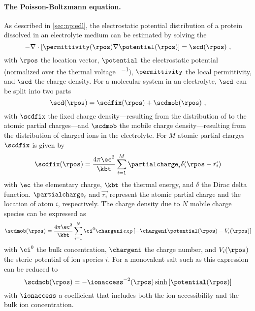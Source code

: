 \paragraph{The Poisson-Boltzmann equation.}
%
As described in \cref{sec:np:edl}, the electrostatic potential distribution of a protein dissolved in an
electrolyte medium can be estimated by solving the ~\cite{Baker-2001,Baker-2005}
%
\begin{equation}\label{eq:pbe}
  - \nabla \cdot \left[ \permittivity (\rpos) \nabla \potential (\rpos) \right] = \scd (\rpos)
  \text{ ,}
\end{equation}
%
with $\rpos$ the location vector, $\potential$ the electrostatic potential (normalized over the thermal
voltage \si{\kT\per\ec}), $\permittivity$ the local permittivity, and $\scd$ the charge density. For a
molecular system in an electrolyte, $\scd$ can be split into two parts
%
\begin{equation}\label{eq:electrostatics_scd}
  \scd (\rpos) = \scdfix(\rpos) + \scdmob(\rpos)
  \text{ ,}
\end{equation}
%
with $\scdfix$ the fixed charge density---resulting from the distribution of to the atomic partial
charges---and $\scdmob$ the mobile charge density---resulting from the distribution of charged ions in the
electrolyte. For $M$ atomic partial charges $\scdfix$ is given by~\cite{Baker-2001,Baker-2005}
%
\begin{equation}\label{eq:electrostatics_scdf}
  \scdfix (\rpos) = \dfrac{4\pi\ec^2}{\kbt} \sum_{i=1}^{M} \partialcharge_i \delta(\rpos - \vec{r_i})
\end{equation}
%
with $\ec$ the elementary charge, $\kbt$ the thermal energy, and $\delta$ the Dirac delta function.
$\partialcharge_i$ and $\vec{r_i}$ represent the atomic partial charge and the location of atom $i$,
respectively. The charge density due to $N$ mobile charge species can be expressed
as~\cite{Baker-2001,Baker-2005}
%
\begin{equation}\label{eq:electrostatics_scdm}
  \scdmob(\rpos) =
    \dfrac{4\pi\ec^2}{\kbt}
      \sum_{i=1}^{N} \ci^0 \chargeni
      \exp{\left[- \chargeni \potential(\rpos) - V_i(\rpos) \right]}
\end{equation}
%
with $\ci^0$ the bulk concentration, $\chargeni$ the charge number, and $V_i(\rpos)$ the steric potential of
ion species $i$. For a monovalent salt such as  this expression can be reduced to
%
\begin{equation}\label{eq:electrostatics_scdm_salt}
    \scdmob (\rpos) = - \ionaccess^{-2} (\rpos) \sinh \left[ \potential (\rpos) \right]
\end{equation}
%
with $\ionaccess$ a coefficient that includes both the ion accessibility and the bulk ion concentration.

